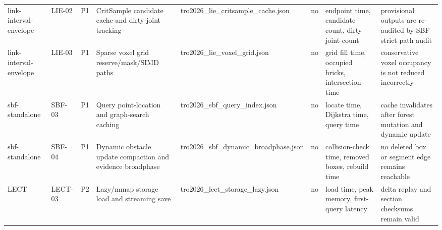 \begin{table}[t]
{\begin{tabular}{llllllll}
link-interval-envelope & LIE-02 & P1 & CritSample candidate cache and dirty-joint tracking & tro2026\_lie\_critsample\_cache.json & no & endpoint time, candidate count, dirty-joint count & provisional outputs are re-audited by SBF strict path audit \\
link-interval-envelope & LIE-03 & P1 & Sparse voxel grid reserve/mask/SIMD paths & tro2026\_lie\_voxel\_grid.json & no & grid fill time, occupied bricks, intersection time & conservative voxel occupancy is not reduced incorrectly \\
sbf-standalone & SBF-03 & P1 & Query point-location and graph-search caching & tro2026\_sbf\_query\_index.json & no & locate time, Dijkstra time, query time & cache invalidates after forest mutation and dynamic update \\
sbf-standalone & SBF-04 & P1 & Dynamic obstacle update compaction and evidence broadphase & tro2026\_sbf\_dynamic\_broadphase.json & no & collision-check time, removed boxes, rebuild time & no deleted box or segment edge remains reachable \\
LECT & LECT-03 & P2 & Lazy/mmap storage load and streaming save & tro2026\_lect\_storage\_lazy.json & no & load time, peak memory, first-query latency & delta replay and section checksums remain valid \\
\bottomrule
\end{tabular}
}
\end{table}
